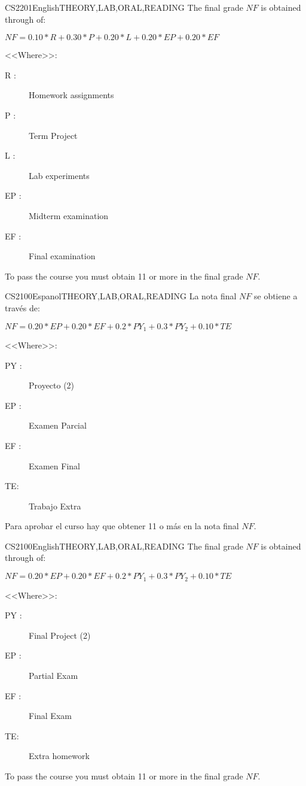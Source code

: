 \begin{evaluation}{CS2201}{English}{THEORY,LAB,ORAL,READING}
The final grade $NF$ is obtained through of:

$ NF =  0.10*R + 0.30*P + 0.20*L + 0.20*EP + 0.20*EF $

\noindent <<Where>>:
\begin{description}
 \item[R :] Homework assignments
 \item[P :] Term Project
 \item[L :] Lab experiments
 \item[EP :] Midterm examination
 \item[EF :] Final examination
\end{description}

\noindent To pass the course you must obtain 11 or more in the final grade $NF$.
\end{evaluation}

\begin{evaluation}{CS2100}{Espanol}{THEORY,LAB,ORAL,READING}
La nota final $NF$ se obtiene a través de:

$ NF = 0.20*EP + 0.20*EF + 0.2*PY_{1} + 0.3*PY_{2} + 0.10*TE $

\noindent <<Where>>:
\begin{description}
 \item[PY :] Proyecto (2)
 \item[EP :] Examen Parcial
 \item[EF :] Examen Final
\item[TE:] Trabajo Extra
\end{description}
\noindent Para aprobar el curso hay que obtener 11 o más en la nota final $NF$.
\end{evaluation}

\begin{evaluation}{CS2100}{English}{THEORY,LAB,ORAL,READING}
The final grade $NF$ is obtained through of:

$ NF = 0.20*EP + 0.20*EF + 0.2*PY_{1} + 0.3*PY_{2} + 0.10*TE $

\noindent <<Where>>:
\begin{description}
 \item[PY :] Final Project (2)
 \item[EP :] Partial Exam
 \item[EF :] Final Exam
\item[TE:] Extra homework
\end{description}
\noindent To pass the course you must obtain 11 or more in the final grade $NF$.
\end{evaluation}

